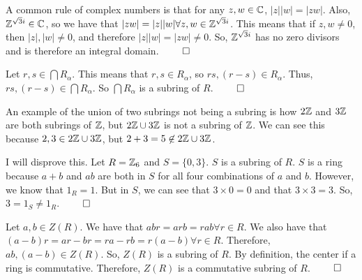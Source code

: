 \documentclass[12pt]{report}
\begin{document}
\sol A common rule of complex numbers is that for any $z, w \in \CC$, $|z||w| = |zw|$. Also, $\ZZ[\sqrt{3}i] \in \CC$, so we have that $|zw| = |z||w| \forall z,w \in \ZZ[\sqrt{3}i]$. This means that if $z,w \neq 0$, then $|z|, |w| \neq 0$, and therefore $|z||w| = |zw| \neq 0$. So, $\ZZ[\sqrt{3}i]$ has no zero divisors and is therefore an integral domain. $\qed$

\sol Let $r,s \in \bigcap R_\alpha$. This means that $r,s \in R_\alpha$, so $rs, (r-s) \in R_\alpha$. Thus, $rs, (r-s) \in \bigcap R_\alpha$. So $\bigcap R_\alpha$ is a subring of $R$. $\qed$

An example of the union of two subrings not being a subring is how $2\ZZ$ and $3\ZZ$ are both subrings of $\ZZ$, but $2\ZZ \cup 3\ZZ$ is not a subring of $\ZZ$. We can see this because $2, 3 \in 2\ZZ \cup 3\ZZ$, but $2 + 3 = 5 \not\in 2\ZZ \cup 3\ZZ$. 

\sol I will disprove this. Let $R = \ZZ_6$ and $S = \{0, 3\}$. $S$ is a subring of $R$. $S$ is a ring because $a + b$ and $ab$ are both in $S$ for all four combinations of $a$ and $b$. However, we know that $1_R = 1$. But in $S$, we can see that $3\times 0 = 0$ and that $3 \times 3 = 3$. So, $3 = 1_S \neq 1_R$. $\qed$ 

\sol Let $a, b \in Z(R)$. We have that $abr = arb = rab \forall r \in R$. We also have that $(a - b)r = ar - br = ra - rb = r(a-b) \forall r \in R$. Therefore, $ab, (a-b) \in Z(R)$. So, $Z(R)$ is a subring of $R$. By definition, the center if a ring is commutative. Therefore, $Z(R)$ is a commutative subring of $R$. $\qed$
\end{document}
